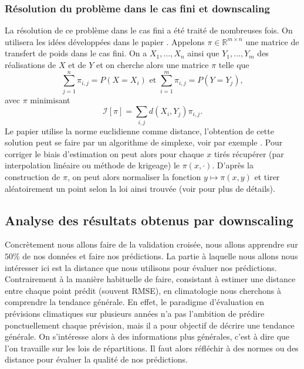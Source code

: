 \documentclass[a4paper,10pt]{article}
\begin{document}
\subsubsection{Résolution du problème dans le cas fini et downscaling}
La résolution de ce problème dans le cas fini a été traité de nombreuses fois. On utilisera les idées développées dans le papier \cite{robin2019multivariate}. Appelons $\pi \in \mathbb{R}^{m\times n}$ une matrice de transfert de poids dans le cas fini. On a $X_1,...,X_n$ ainsi que $Y_1,...,Y_m$ des réalisations de $X$ et de $Y$ et on cherche alors une matrice $\pi$ telle que 
\[\sum_{j=1}^{n} \pi_{i,j}= P(X=X_i) \textrm{ et } \sum_{i=1}^{m} \pi_{i,j}= P(Y=Y_j),\]
avec $\pi$ minimisant 
\[\mathcal{I}[\pi]=\sum_{i,j}d(X_i,Y_j)\pi_{i,j}.\]  
Le papier utilise la norme euclidienne comme distance, l'obtention de cette solution peut se faire par un algorithme de simplexe, voir par exemple \cite{huang2012optimal}. Pour corriger le biais d'estimation on peut alors pour chaque $x$ tirés récupérer (par interpolation linéaire ou méthode de krigeage) le $\pi(x,\cdot)$. D'après la construction de $\pi$, on peut alors normaliser la fonction $y\mapsto \pi(x,y)$ et tirer aléatoirement un point selon la loi ainsi trouvée (voir \cite{robin2019multivariate} pour plus de détails).




\subsection{Analyse des résultats obtenus par downscaling}
\label{analyse-pred}
Concrètement nous allons faire de la validation croisée, nous allons apprendre sur $50\%$ de nos données et faire nos prédictions. La partie à laquelle nous allons nous intéresser ici est la distance que nous utilisons pour évaluer nos prédictions. Contrairement à la manière habituelle de faire, consistant à estimer une distance entre chaque point prédit (souvent RMSE), en climatologie nous cherchons à comprendre la tendance générale. En effet, le paradigme d'évaluation en prévisions climatiques sur plusieurs années n'a pas l'ambition de prédire ponctuellement chaque prévision, mais il a pour objectif de décrire une tendance générale. On s'intéresse alors à des informations plus générales, c'est à dire que l'on travaille sur les lois de répartitions. Il faut alors réfléchir à des normes ou des distance pour évaluer la qualité de nos prédictions.  

\vspace{0.7cm}
\end{document}
